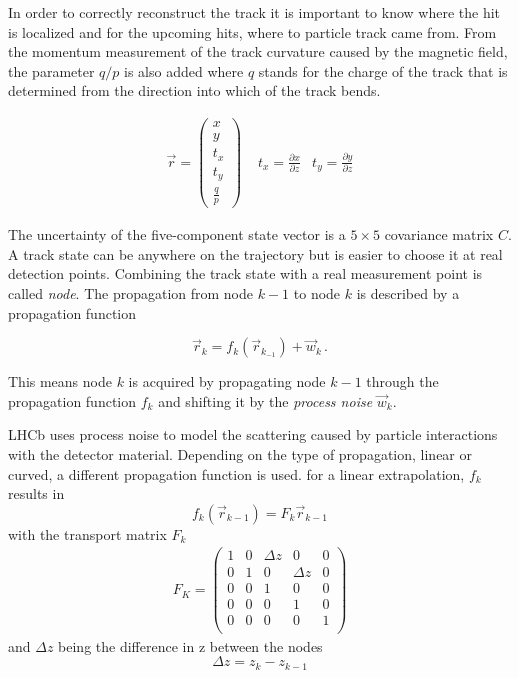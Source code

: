 In order to correctly reconstruct the track it is important to know where the hit is localized and for the upcoming hits, where to particle track came from. From the momentum measurement of the track curvature caused by the magnetic field, the parameter $q/p$ is also added where $q$ stands for the charge of the track that is determined from the direction into which of the track bends.

\begin{align*}
  \vec{r} = \left(\begin{array}{c} x \\ y \\ t_x \\ t_y \\ \frac{q}{p}\end{array}\right) &\,\, t_x = \frac{\partial x}{\partial z} & t_y = \frac{\partial y}{\partial z}
\end{align*}

The uncertainty of the five-component state vector is a $5\times5$ covariance matrix $C$.
A track state can be anywhere on the trajectory but is easier to choose it at real detection points. Combining the track state with a real measurement point is called \textit{node}.
The propagation from node $k-1$ to node $k$ is described by a propagation function

\begin{equation*}
  \vec{r}_k = f_k(\vec{r}_{k_{-1}}) + \vec{w}_k\,.
\end{equation*}

This means node $k$ is acquired by propagating node $k-1$ through the propagation function $f_k$ and shifting it by the \textit{process noise} $\vec{w}_k$.

LHCb uses process noise to model the scattering caused by particle interactions with the detector material.
Depending on the type of propagation, linear or curved, a different propagation function is used.
for a linear extrapolation, $f_k$ results in
\begin{equation*}
  f_k \left(\vec{r}_{k-1}\right) = F_k \vec{r}_{k-1}
\end{equation*}
with the transport matrix $F_k$
\begin{gather*}
  F_K = \begin{pmatrix}
    1 & 0 & \Delta z & 0 & 0 \\
    0 & 1 & 0 & \Delta z & 0 \\
    0 & 0 & 1 & 0 & 0 \\
    0 & 0 & 0 & 1 & 0 \\
    0 & 0 & 0 & 0 & 1 \\
  \end{pmatrix}
\end{gather*}
and $\Delta z$ being the difference in z between the nodes
\begin{equation*}
  \Delta z = z_k - z_{k-1}
\end{equation*}

